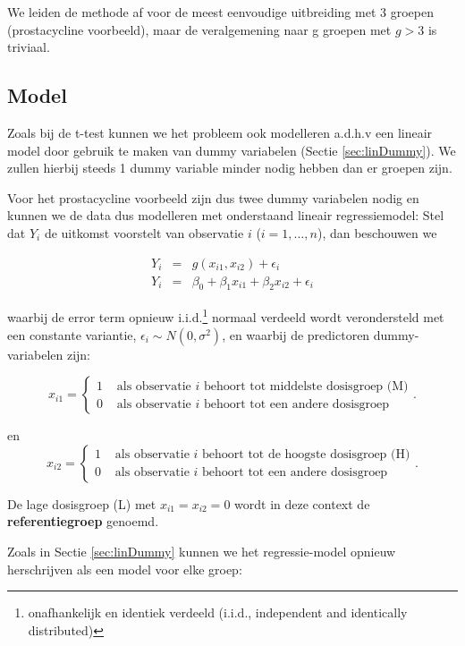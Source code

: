 \documentclass[
  12pt,dutch]{book}
\theoremstyle{definition}
\theoremstyle{definition}
\theoremstyle{definition}
\theoremstyle{definition}
\theoremstyle{remark}
\begin{document}
We leiden de methode af voor de meest eenvoudige uitbreiding met 3 groepen (prostacycline voorbeeld), maar de veralgemening naar g groepen met \(g>3\) is triviaal.

\subsection{Model}\label{model-2}

Zoals bij de t-test kunnen we het probleem ook modelleren a.d.h.v een lineair model door gebruik te maken van dummy variabelen (Sectie \ref{sec:linDummy}).
We zullen hierbij steeds 1 dummy variable minder nodig hebben dan er groepen zijn.

Voor het prostacycline voorbeeld zijn dus twee dummy variabelen nodig en kunnen we de data dus modelleren met onderstaand lineair regressiemodel:
Stel dat \(Y_i\) de uitkomst voorstelt van observatie \(i\) (\(i=1,\ldots, n\)), dan beschouwen we

\begin{eqnarray}
  Y_i &=& g(x_{i1},x_{i2}) + \epsilon_i\\
  Y_i &=& \beta_0+\beta_1 x_{i1} +\beta_2 x_{i2} +\epsilon_i \label{eq:regmu3}
\end{eqnarray}

waarbij de error term opnieuw i.i.d.\footnote{onafhankelijk en identiek verdeeld (i.i.d., independent and identically distributed)} normaal verdeeld wordt verondersteld met een constante variantie, \(\epsilon_i\sim N(0,\sigma^2)\), en waarbij de predictoren dummy-variabelen zijn:

\[x_{i1} = \left\{ \begin{array}{ll}
1 & \text{ als observatie $i$ behoort tot middelste dosisgroep (M)} \\
0 & \text{ als observatie $i$ behoort tot  een andere dosisgroep} \end{array}\right. .\]

en
\[x_{i2} = \left\{ \begin{array}{ll}
1 & \text{ als observatie $i$ behoort tot de hoogste dosisgroep (H)} \\
0 & \text{ als observatie $i$ behoort tot een andere dosisgroep} \end{array}\right. .\]

De lage dosisgroep (L) met \(x_{i1}=x_{i2}=0\) wordt in deze context de \textbf{referentiegroep} genoemd.

Zoals in Sectie \ref{sec:linDummy} kunnen we het regressie-model opnieuw herschrijven als een model voor elke groep:
\end{document}
